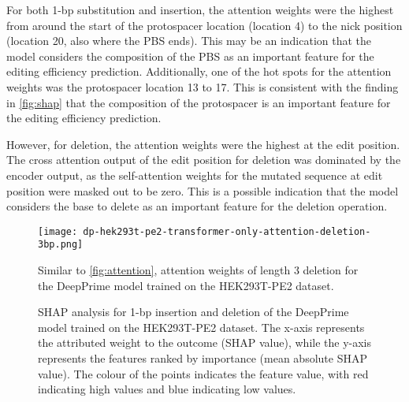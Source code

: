 For both 1-bp substitution and insertion, the attention weights were the highest from around the start of the protospacer location (location 4) to the nick position (location 20, also where the PBS ends). This may be an indication that the model considers the composition of the PBS as an important feature for the editing efficiency prediction. Additionally, one of the hot spots for the attention weights was the protospacer location 13 to 17. This is consistent with the finding in \autoref{fig:shap} that the composition of the protospacer is an important feature for the editing efficiency prediction.

However, for deletion, the attention weights were the highest at the edit position. The cross attention output of the edit position for deletion was dominated by the encoder output, as the self-attention weights for the mutated sequence at edit position were masked out to be zero. This is a possible indication that the model considers the base to delete as an important feature for the deletion operation.

\begin{figure}
    \centering
    \texttt{[image: dp-hek293t-pe2-transformer-only-attention-deletion-3bp.png]}
    \caption[Attention weights for 3-bp deletion of the DeepPrime model trained on the HEK293T-PE2 dataset]{Similar to \autoref{fig:attention}, attention weights of length 3 deletion for the DeepPrime model trained on the HEK293T-PE2 dataset.}
    \label{fig:attention_deletion_3bp}
\end{figure}

\begin{figure}
    \caption[SHAP analysis for 1-bp insertion and deletion of the DeepPrime model trained on the HEK293T-PE2 dataset]{SHAP analysis for 1-bp insertion and deletion of the DeepPrime model trained on the HEK293T-PE2 dataset. The x-axis represents the attributed weight to the outcome (SHAP value), while the y-axis represents the features ranked by importance (mean absolute SHAP value). The colour of the points indicates the feature value, with red indicating high values and blue indicating low values.}
    \label{fig:shap-1bp}
\end{figure}

